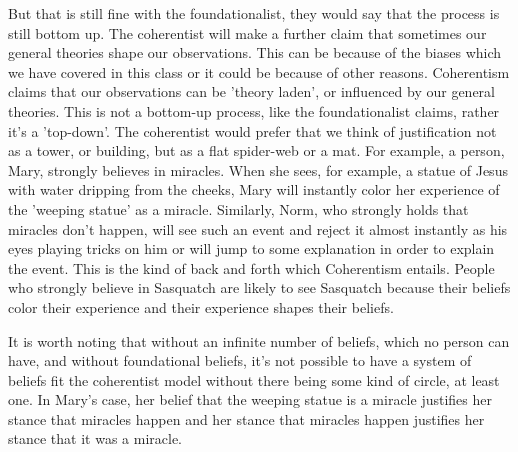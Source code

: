 But that is still fine with the foundationalist, they would say that the process is still bottom up. The coherentist will make a further claim that sometimes our general theories shape our observations. This can be because of the biases which we have covered in this class or it could be because of other reasons. Coherentism claims that our observations can be 'theory laden', or influenced by our general theories. This is not a bottom-up process, like the foundationalist claims, rather it's a 'top-down'. The coherentist would prefer that we think of justification not as a tower, or building, but as a flat spider-web or a mat. For example, a person, Mary, strongly believes in miracles. When she sees, for example, a statue of Jesus with water dripping from the cheeks, Mary will instantly color her experience of the 'weeping statue' as a miracle. Similarly, Norm, who strongly holds that miracles don't happen, will see such an event and reject it almost instantly as his eyes playing tricks on him or will jump to some explanation in order to explain the event. This is the kind of back and forth which Coherentism entails. People who strongly believe in Sasquatch are likely to see Sasquatch because their beliefs color their experience and their experience shapes their beliefs. 

It is worth noting that without an infinite number of beliefs, which no person can have, and without foundational beliefs, it's not possible to have a system of beliefs fit the coherentist model without there being some kind of circle, at least one. In Mary's case, her belief that the weeping statue is a miracle justifies her stance that miracles happen and her stance that miracles happen justifies her stance that it was a miracle.